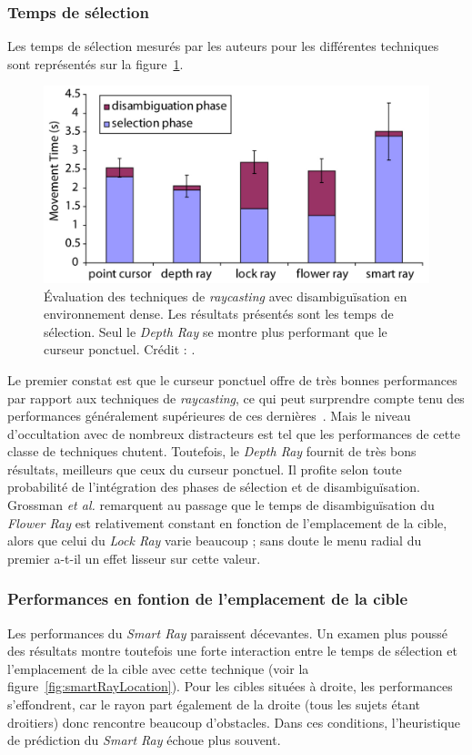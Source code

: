 	\subsubsection{Temps de sélection}
	
	Les temps de sélection mesurés par les auteurs pour les différentes techniques sont représentés sur la figure~\ref{fig:rayTimes}.

	\begin{figure}[H]
		\centering
		\includegraphics[width=\textwidth]{figures/ch2/rayTimes}
		\caption[Évaluation des techniques de \emph{raycasting} avec disambiguïsation]{Évaluation des techniques de \emph{raycasting} avec disambiguïsation en environnement dense. Les résultats présentés sont les temps de sélection. Seul le \emph{Depth Ray} se montre plus performant que le curseur ponctuel. Crédit : \cite{grossman2006design}.}
		\label{fig:rayTimes}
	\end{figure}

	Le premier constat est que le curseur ponctuel offre de très bonnes performances par rapport aux techniques de \emph{raycasting}, ce qui peut surprendre compte tenu des performances généralement supérieures de ces dernières~\cite{bowman2001testbed}. Mais le niveau d'occultation avec de nombreux distracteurs est tel que les performances de cette classe de techniques chutent. Toutefois, le \emph{Depth Ray} fournit de très bons résultats, meilleurs que ceux du curseur ponctuel. Il profite selon toute probabilité de l'intégration des phases de sélection et de disambiguïsation. Grossman \emph{et al.} remarquent au passage que le temps de disambiguïsation du \emph{Flower Ray} est relativement constant en fonction de l'emplacement de la cible, alors que celui du \emph{Lock Ray} varie beaucoup ; sans doute le menu radial du premier a-t-il un effet lisseur sur cette valeur.

	\subsubsection{Performances en fontion de l'emplacement de la cible}
	Les performances du \emph{Smart Ray} paraissent décevantes. Un examen plus poussé des résultats montre toutefois une forte interaction entre le temps de sélection et l'emplacement de la cible avec cette technique (voir la figure~\ref{fig:smartRayLocation}). Pour les cibles situées à droite, les performances s'effondrent, car le rayon part également de la droite (tous les sujets étant droitiers) donc rencontre beaucoup d'obstacles. Dans ces conditions, l'heuristique de prédiction du \emph{Smart Ray} échoue plus souvent.

